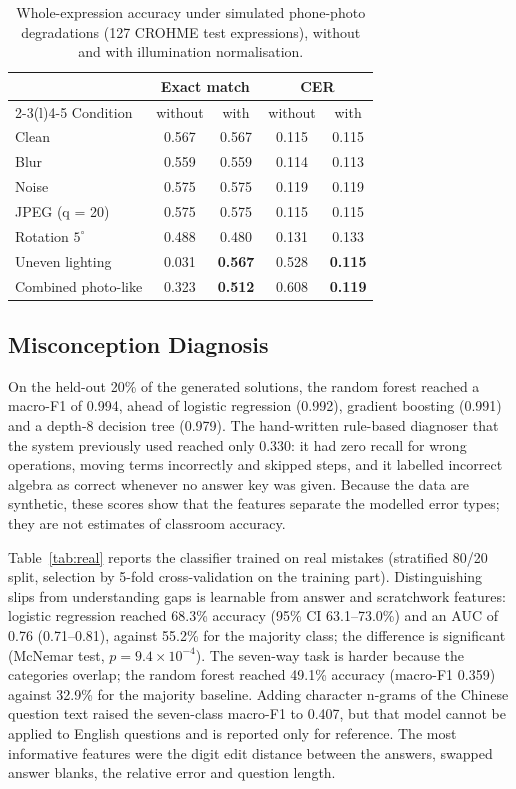 \documentclass[runningheads]{llncs}
\begin{document}
\begin{table}[t]
\caption{Whole-expression accuracy under simulated phone-photo degradations (127 CROHME test expressions), without and with illumination normalisation.}\label{tab:robust}
\centering\small
\begin{tabular}{@{}lcccc@{}}
\toprule
& \multicolumn{2}{c}{Exact match} & \multicolumn{2}{c}{CER} \\
\cmidrule(lr){2-3}\cmidrule(l){4-5}
Condition & without & with & without & with \\
\midrule
Clean & 0.567 & 0.567 & 0.115 & 0.115 \\
Blur & 0.559 & 0.559 & 0.114 & 0.113 \\
Noise & 0.575 & 0.575 & 0.119 & 0.119 \\
JPEG (q = 20) & 0.575 & 0.575 & 0.115 & 0.115 \\
Rotation $5^\circ$ & 0.488 & 0.480 & 0.131 & 0.133 \\
Uneven lighting & 0.031 & \textbf{0.567} & 0.528 & \textbf{0.115} \\
Combined photo-like & 0.323 & \textbf{0.512} & 0.608 & \textbf{0.119} \\
\bottomrule
\end{tabular}
\end{table}

\subsection{Misconception Diagnosis}

On the held-out 20\% of the generated solutions, the random forest reached a macro-F1 of 0.994, ahead of logistic regression (0.992), gradient boosting (0.991) and a depth-8 decision tree (0.979). The hand-written rule-based diagnoser that the system previously used reached only 0.330: it had zero recall for wrong operations, moving terms incorrectly and skipped steps, and it labelled incorrect algebra as correct whenever no answer key was given. Because the data are synthetic, these scores show that the features separate the modelled error types; they are not estimates of classroom accuracy.

Table~\ref{tab:real} reports the classifier trained on real mistakes (stratified 80/20 split, selection by 5-fold cross-validation on the training part). Distinguishing slips from understanding gaps is learnable from answer and scratchwork features: logistic regression reached 68.3\% accuracy (95\% CI 63.1--73.0\%) and an AUC of 0.76 (0.71--0.81), against 55.2\% for the majority class; the difference is significant (McNemar test, $p=9.4\times10^{-4}$). The seven-way task is harder because the categories overlap; the random forest reached 49.1\% accuracy (macro-F1 0.359) against 32.9\% for the majority baseline. Adding character n-grams of the Chinese question text raised the seven-class macro-F1 to 0.407, but that model cannot be applied to English questions and is reported only for reference. The most informative features were the digit edit distance between the answers, swapped answer blanks, the relative error and question length.
\end{document}
